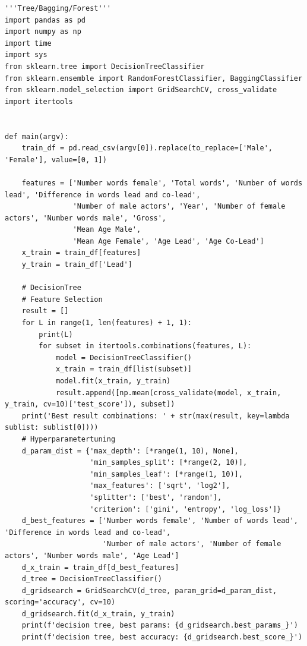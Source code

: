 \documentclass{article}
\begin{document}
\begin{verbatim}
'''Tree/Bagging/Forest'''
import pandas as pd
import numpy as np
import time
import sys
from sklearn.tree import DecisionTreeClassifier
from sklearn.ensemble import RandomForestClassifier, BaggingClassifier
from sklearn.model_selection import GridSearchCV, cross_validate
import itertools


def main(argv):
    train_df = pd.read_csv(argv[0]).replace(to_replace=['Male', 'Female'], value=[0, 1])

    features = ['Number words female', 'Total words', 'Number of words lead', 'Difference in words lead and co-lead',
                'Number of male actors', 'Year', 'Number of female actors', 'Number words male', 'Gross',
                'Mean Age Male',
                'Mean Age Female', 'Age Lead', 'Age Co-Lead']
    x_train = train_df[features]
    y_train = train_df['Lead']

    # DecisionTree
    # Feature Selection
    result = []
    for L in range(1, len(features) + 1, 1):
        print(L)
        for subset in itertools.combinations(features, L):
            model = DecisionTreeClassifier()
            x_train = train_df[list(subset)]
            model.fit(x_train, y_train)
            result.append([np.mean(cross_validate(model, x_train, y_train, cv=10)['test_score']), subset])
    print('Best result combinations: ' + str(max(result, key=lambda sublist: sublist[0])))
    # Hyperparametertuning
    d_param_dist = {'max_depth': [*range(1, 10), None],
                    'min_samples_split': [*range(2, 10)],
                    'min_samples_leaf': [*range(1, 10)],
                    'max_features': ['sqrt', 'log2'],
                    'splitter': ['best', 'random'],
                    'criterion': ['gini', 'entropy', 'log_loss']}
    d_best_features = ['Number words female', 'Number of words lead', 'Difference in words lead and co-lead',
                       'Number of male actors', 'Number of female actors', 'Number words male', 'Age Lead']
    d_x_train = train_df[d_best_features]
    d_tree = DecisionTreeClassifier()
    d_gridsearch = GridSearchCV(d_tree, param_grid=d_param_dist, scoring='accuracy', cv=10)
    d_gridsearch.fit(d_x_train, y_train)
    print(f'decision tree, best params: {d_gridsearch.best_params_}')
    print(f'decision tree, best accuracy: {d_gridsearch.best_score_}')


\end{verbatim}
\end{document}
